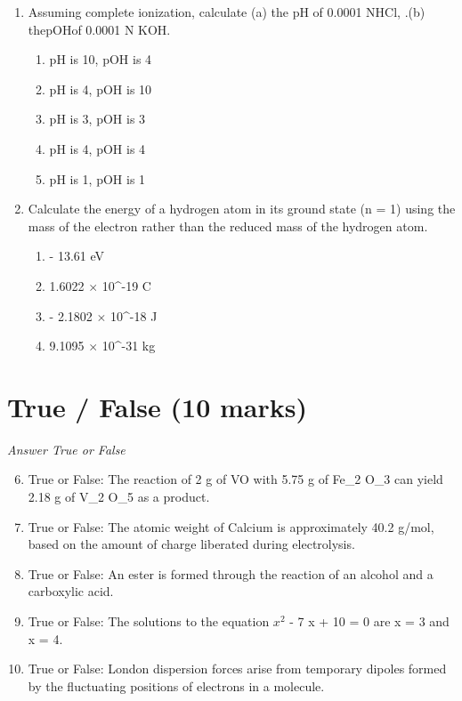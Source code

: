 \documentclass[12pt]{article}
\begin{document}
\begin{enumerate}[label=\arabic*.]
\item Assuming complete ionization, calculate (a) the pH of 0.0001 NHCl, .(b) thepOHof 0.0001 N KOH.
\begin{enumerate}[label=(\alph*)]
    \item pH is 10, pOH is 4
    \item pH is 4, pOH is 10
    \item pH is 3, pOH is 3
    \item pH is 4, pOH is 4
    \item pH is 1, pOH is 1
\end{enumerate}
\item Calculate the energy of a hydrogen atom in its ground state (n = 1) using the mass of the electron rather than the reduced mass of the hydrogen atom.
\begin{enumerate}[label=(\alph*)]
    \item - 13.61 eV
    \item 1.6022 \ensuremath{\times} 10^-19 C
    \item - 2.1802 \ensuremath{\times} 10^-18 J
    \item 9.1095 \ensuremath{\times} 10^-31 kg
\end{enumerate}
\end{enumerate}

\section*{True / False (10 marks)}
\textit{Answer True or False}
\begin{enumerate}[label=\arabic*.]
\setcounter{enumi}{5}
\item True or False: The reaction of 2 g of VO with 5.75 g of Fe\_2 O\_3 can yield 2.18 g of V\_2 O\_5 as a product.
\item True or False: The atomic weight of Calcium is approximately 40.2 g/mol, based on the amount of charge liberated during electrolysis.
\item True or False: An ester is formed through the reaction of an alcohol and a carboxylic acid.
\item True or False: The solutions to the equation $x^2$ - 7 x + 10 = 0 are x = 3 and x = 4.
\item True or False: London dispersion forces arise from temporary dipoles formed by the fluctuating positions of electrons in a molecule.
\end{enumerate}
\end{document}
